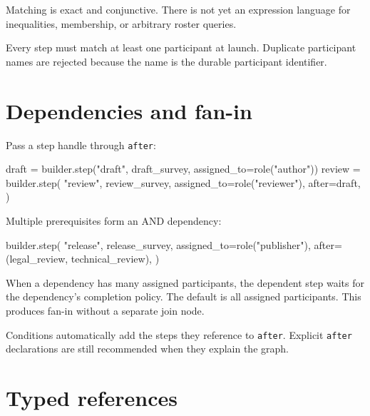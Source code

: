\documentclass[
  10pt,
]{report}
\newenvironment{Shaded}{}{}
\newcommand{\NormalTok}[1]{#1}
\newcommand{\OperatorTok}[1]{\textcolor[rgb]{0.40,0.40,0.40}{#1}}
\newcommand{\StringTok}[1]{\textcolor[rgb]{0.25,0.44,0.63}{#1}}
\begin{document}
Matching is exact and conjunctive. There is not yet an expression
language for inequalities, membership, or arbitrary roster queries.

Every step must match at least one participant at launch. Duplicate
participant names are rejected because the name is the durable
participant identifier.

\chapter{Dependencies and fan-in}\label{dependencies-and-fan-in}

Pass a step handle through \texttt{after}:

\begin{Shaded}
\begin{Highlighting}[]
\NormalTok{draft }\OperatorTok{=}\NormalTok{ builder.step(}\StringTok{"draft"}\NormalTok{, draft\_survey, assigned\_to}\OperatorTok{=}\NormalTok{role(}\StringTok{"author"}\NormalTok{))}
\NormalTok{review }\OperatorTok{=}\NormalTok{ builder.step(}
    \StringTok{"review"}\NormalTok{,}
\NormalTok{    review\_survey,}
\NormalTok{    assigned\_to}\OperatorTok{=}\NormalTok{role(}\StringTok{"reviewer"}\NormalTok{),}
\NormalTok{    after}\OperatorTok{=}\NormalTok{draft,}
\NormalTok{)}
\end{Highlighting}
\end{Shaded}

Multiple prerequisites form an AND dependency:

\begin{Shaded}
\begin{Highlighting}[]
\NormalTok{builder.step(}
    \StringTok{"release"}\NormalTok{,}
\NormalTok{    release\_survey,}
\NormalTok{    assigned\_to}\OperatorTok{=}\NormalTok{role(}\StringTok{"publisher"}\NormalTok{),}
\NormalTok{    after}\OperatorTok{=}\NormalTok{(legal\_review, technical\_review),}
\NormalTok{)}
\end{Highlighting}
\end{Shaded}

When a dependency has many assigned participants, the dependent step
waits for the dependency's completion policy. The default is all
assigned participants. This produces fan-in without a separate join
node.

Conditions automatically add the steps they reference to \texttt{after}.
Explicit \texttt{after} declarations are still recommended when they
explain the graph.

\chapter{Typed references}\label{typed-references}
\end{document}
